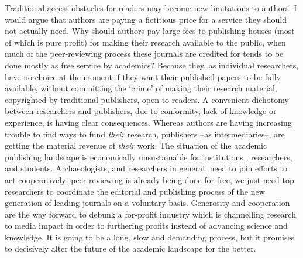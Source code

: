 Traditional access obstacles for readers may become new limitations to authors. I would argue that authors are paying a fictitious price for a service they should not actually need. Why should authors pay large fees to publishing houses (most of which is pure profit) for making their research available to the public, when much of the peer-reviewing process these journals are credited for tends to be done mostly as free service by academics? Because they, as individual researchers, have no choice at the moment if they want their published papers to be fully available, without committing the ‘crime’ of making their research material, copyrighted by traditional publishers, open to readers. A convenient dichotomy between researchers and publishers, due to conformity, lack of knowledge or experience, is having clear consequences. Whereas authors are having increasing trouble to find ways to fund \textit{their} research, publishers –as intermediaries–, are getting the material revenue of \textit{their} work. The situation of the academic publishing landscape is economically unsustainable for institutions \parencite{Sample_2012}, researchers, and students.  Archaeologists, and researchers in general, need to join efforts to act cooperatively: peer-reviewing is already being done for free, we just need top researchers to coordinate the editorial and publishing process of the new generation of leading journals on a voluntary basis. Generosity and cooperation are the way forward to debunk a for-profit industry which is channelling research to media impact in order to furthering profits instead of advancing science and knowledge. It is going to be a long, slow and demanding process, but it promises to decisively alter the future of the academic landscape for the better.

